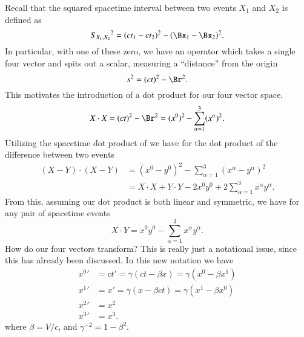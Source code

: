 Recall that the squared spacetime interval between two events \(X_1\) and \(X_2\) is defined as
%
\begin{equation}\label{eqn:relativisticElectrodynamicsT1:60}
{S_{X_1, X_2}}^2 = (ct_1 - c t_2)^2 - (\Bx_1 - \Bx_2)^2.
\end{equation}
%
In particular, with one of these zero, we have an operator which takes a single four vector and spits out a scalar, measuring a ``distance'' from the origin
%
\begin{equation}\label{eqn:relativisticElectrodynamicsT1:30}
s^2 = (ct)^2 - \Br^2.
\end{equation}
%
This motivates the introduction of a dot product for our four vector space.
%
\begin{equation}\label{eqn:relativisticElectrodynamicsT1:50}
X \cdot X = (ct)^2 - \Br^2 = (x^0)^2 - \sum_{\alpha=1}^3 (x^\alpha)^2.
\end{equation}
%
Utilizing the spacetime dot product of  we have for the dot product of the difference between two events
%
\begin{equation}\label{eqn:relativisticElectrodynamicsT1a:140}
\begin{aligned}
(X - Y) \cdot (X - Y)
&=
(x^0 - y^0)^2 - \sum_{\alpha =1}^3 (x^\alpha - y^\alpha)^2 \\
&=
X \cdot X + Y \cdot Y - 2 x^0 y^0 + 2 \sum_{\alpha =1}^3 x^\alpha y^\alpha.
\end{aligned}
\end{equation}
%
From this, assuming our dot product  is both linear and symmetric, we have for any pair of spacetime events
%
\begin{equation}\label{eqn:relativisticElectrodynamicsT1:55}
X \cdot Y = x^0 y^0 - \sum_{\alpha =1}^3 x^\alpha y^\alpha.
\end{equation}
%
How do our four vectors transform?  This is really just a notational issue, since this has already been discussed.  In this new notation we have
%
\begin{equation}\label{eqn:relativisticElectrodynamicsT1:90}
\begin{aligned}
{x^0}' &= ct' = \gamma ( ct - \beta x) = \gamma ( x^0 - \beta x^1 ) \\
{x^1}' &= x' = \gamma ( x - \beta ct ) = \gamma ( x^1 - \beta x^0 ) \\
{x^2}' &= x^2 \\
{x^3}' &= x^3.
\end{aligned}
\end{equation}
%
where \(\beta = V/c\), and \(\gamma^{-2} = 1 - \beta^2\).

